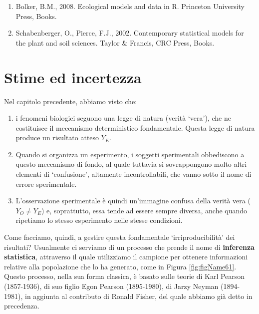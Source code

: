 \documentclass[a4paper,12pt,oneside]{book}
\providecommand{\tightlist}{%
  \setlength{\itemsep}{0pt}\setlength{\parskip}{0pt}}
\begin{document}
\begin{enumerate}
\def\labelenumi{\arabic{enumi}.}
\tightlist
\item
  Bolker, B.M., 2008. Ecological models and data in R. Princeton University Press, Books.
\item
  Schabenberger, O., Pierce, F.J., 2002. Contemporary statistical models for the plant and soil sciences. Taylor \& Francis, CRC Press, Books.
\end{enumerate}

\hypertarget{stime-ed-incertezza}{%
\chapter{Stime ed incertezza}\label{stime-ed-incertezza}}

Nel capitolo precedente, abbiamo visto che:

\begin{enumerate}
\def\labelenumi{\arabic{enumi}.}
\tightlist
\item
  i fenomeni biologici seguono una legge di natura (verità `vera'), che ne costituisce il meccanismo deterministico fondamentale. Questa legge di natura produce un risultato atteso \(Y_E\).
\item
  Quando si organizza un esperimento, i soggetti sperimentali obbediscono a questo meccanismo di fondo, al quale tuttavia si sovrappongono molto altri elementi di `confusione', altamente incontrollabili, che vanno sotto il nome di errore sperimentale.
\item
  L'osservazione sperimentale è quindi un'immagine confusa della verità vera (\(Y_O \neq Y_E\)) e, soprattutto, essa tende ad essere sempre diversa, anche quando ripetiamo lo stesso esperimento nelle stesse condizioni.
\end{enumerate}

Come facciamo, quindi, a gestire questa fondamentale `irriproducibilità' dei risultati? Usualmente ci serviamo di un processo che prende il nome di \textbf{inferenza statistica}, attraverso il quale utilizziamo il campione per ottenere informazioni relative alla popolazione che lo ha generato, come in Figura \ref{fig:figName61}. Questo processo, nella sua forma classica, è basato sulle teorie di Karl Pearson (1857-1936), di suo figlio Egon Pearson (1895-1980), di Jarzy Neyman (1894-1981), in aggiunta al contributo di Ronald Fisher, del quale abbiamo già detto in precedenza.
\end{document}
